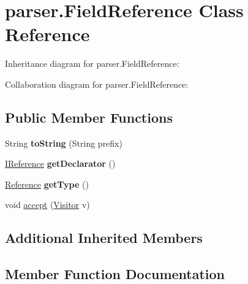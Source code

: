\hypertarget{classparser_1_1_field_reference}{}\section{parser.\+Field\+Reference Class Reference}
\label{classparser_1_1_field_reference}


Inheritance diagram for parser.\+Field\+Reference\+:


Collaboration diagram for parser.\+Field\+Reference\+:
\subsection*{Public Member Functions}
\begin{DoxyCompactItemize}
\item 
String {\bfseries to\+String} (String prefix)\hypertarget{classparser_1_1_field_reference_abcaeb5d6231415eb0a3bc18fa0de9fd7}{}\label{classparser_1_1_field_reference_abcaeb5d6231415eb0a3bc18fa0de9fd7}

\item 
\hyperlink{interfaceparser_1_1_i_reference}{I\+Reference} {\bfseries get\+Declarator} ()\hypertarget{classparser_1_1_field_reference_ab651a8b06a60ebfac45ef14461b65d6c}{}\label{classparser_1_1_field_reference_ab651a8b06a60ebfac45ef14461b65d6c}

\item 
\hyperlink{classparser_1_1_reference}{Reference} {\bfseries get\+Type} ()\hypertarget{classparser_1_1_field_reference_a6a8e2d1d70666721d0b0b616384575bc}{}\label{classparser_1_1_field_reference_a6a8e2d1d70666721d0b0b616384575bc}

\item 
void \hyperlink{classparser_1_1_field_reference_af5cf1cfa0707ab5ff98107e6f9a76fd4}{accept} (\hyperlink{interfacemain_1_1_visitor}{Visitor} v)
\end{DoxyCompactItemize}
\subsection*{Additional Inherited Members}


\subsection{Member Function Documentation}

